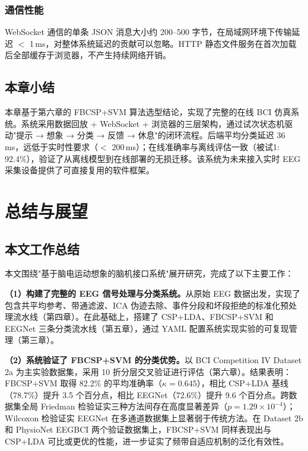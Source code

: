 \subsubsection{通信性能}

WebSocket 通信的单条 JSON 消息大小约 200--500 字节，在局域网环境下传输延迟 $<$ 1\,ms，对整体系统延迟的贡献可以忽略。HTTP 静态文件服务在首次加载后全部缓存于浏览器，不产生持续网络开销。

\subsection{本章小结}

本章基于第六章的 FBCSP+SVM 算法选型结论，实现了完整的在线 BCI 仿真系统。系统采用数据回放 + WebSocket + 浏览器的三层架构，通过试次状态机驱动"提示 → 想象 → 分类 → 反馈 → 休息"的闭环流程。后端平均分类延迟 36\,ms，远低于实时性要求（$<$ 200\,ms）；在线准确率与离线评估一致（被试1: 92.4\%），验证了从离线模型到在线部署的无损迁移。该系统为未来接入实时 EEG 采集设备提供了可直接复用的软件框架。


\section{总结与展望}
\label{sec:conclusion}

\subsection{本文工作总结}

本文围绕"基于脑电运动想象的脑机接口系统"展开研究，完成了以下主要工作：

\textbf{（1）构建了完整的 EEG 信号处理与分类系统。}从原始 EEG 数据出发，实现了包含共平均参考、带通滤波、ICA 伪迹去除、事件分段和坏段拒绝的标准化预处理流水线（第四章）。在此基础上，搭建了 CSP+LDA、FBCSP+SVM 和 EEGNet 三条分类流水线（第五章），通过 YAML 配置系统实现实验的可复现管理（第三章）。

\textbf{（2）系统验证了 FBCSP+SVM 的分类优势。}以 BCI Competition IV Dataset 2a 为主实验数据集，采用 10 折分层交叉验证进行评估（第六章）。结果表明：FBCSP+SVM 取得 82.2\% 的平均准确率（$\kappa = 0.645$），相比 CSP+LDA 基线（78.7\%）提升 3.5 个百分点，相比 EEGNet（72.6\%）提升 9.6 个百分点。跨数据集全局 Friedman 检验证实三种方法间存在高度显著差异（$p = 1.29 \times 10^{-4}$）；Wilcoxon 检验证实 EEGNet 在多通道数据集上显著弱于传统方法。在 Dataset 2b 和 PhysioNet EEGBCI 两个验证数据集上，FBCSP+SVM 同样表现出与 CSP+LDA 可比或更优的性能，进一步证实了频带自适应机制的泛化有效性。

